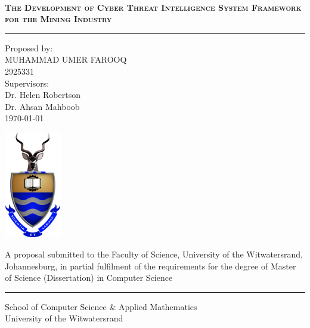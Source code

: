\documentclass[a4paper,twoside,12pt]{report}
\begin{document}
\onecolumn
\thispagestyle{empty}

\setcounter{page}{0}
\ 
\begin{center}
  \vfill
  {
  \huge \bf \textsc{The Development of Cyber Threat Intelligence System Framework for the Mining Industry}\\
  \rule{\linewidth}{0.5pt}



  \normalsize
  Proposed by:\\
  MUHAMMAD UMER FAROOQ\\
  2925331\\[20pt]
  Supervisors:\\[10pt]
  Dr. Helen Robertson\\[10pt]
  Dr. Ahsan Mahboob\\[10pt]
  \today
  }
  \vfill

  \vfill
  \includegraphics[width=2.5cm]{images/wits.png}
  \vfill
  \vfill

  \small{A proposal submitted to the Faculty of Science, University of the Witwatersrand, Johannesburg,
in partial fulfilment of the requirements for the degree of Master of Science (Dissertation) in Computer Science}\\
\rule{\linewidth}{0.5pt}
\large School of Computer Science \& Applied Mathematics\\
\large University of the Witwatersrand\\[20pt]

\end{center}
\vfill
\newpage

\pagestyle{plain}
\setcounter{page}{1}
\end{document}
